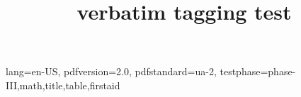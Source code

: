 \DocumentMetadata
  {
    lang=en-US,
    pdfversion=2.0,
    pdfstandard=ua-2,
    testphase={phase-III,math,title,table,firstaid}
  }
\begin{filecontents*}{tst.tex}
Some verbatim text
}%
\end{filecontents*}
\documentclass{article}
\usepackage{verbatim}

\title{verbatim tagging test}





\begin{verbatim}
Some verbatim text
}% ^_
\end{verbatim}

